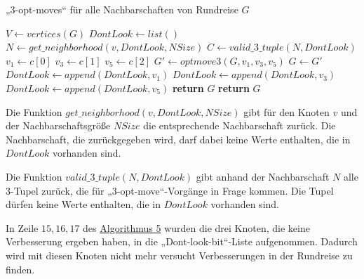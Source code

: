 \begin{algorithm}
  \caption{„3-opt-moves“ für alle Nachbarschaften von Rundreise $G$}\label{alg:ls3opt_run}
\begin{algorithmic}[1]
   
    \State $V \gets vertices(G)$
    \State $DontLook \gets list()$
      \State $N \gets get\_neighborhood(v, DontLook, NSize)$
      \State $C \gets valid\_3\_tuple(N, DontLook)$
        \State $v_1 \gets c[0]$
        \State $v_3 \gets c[1]$
        \State $v_5 \gets c[2]$
        \State $G' \gets optmove3(G, v_1,v_3,v_5)$ 
          \State $G \gets G'$ 
        \Else
          \State $DontLook \gets append(DontLook, v_1)$ 
          \State $DontLook \gets append(DontLook, v_3)$
          \State $DontLook \gets append(DontLook, v_5)$
        \EndIf
      \EndForeach
        \State \textbf{return} $G$ 
      \EndIf
    \EndForeach
    \State \textbf{return} $G$
  \EndProcedure
\end{algorithmic}
\end{algorithm}

\begin{bem}
  Die Funktion $get\_neighborhood(v, DontLook, NSize)$ gibt für den
  Knoten $v$ und der Nachbarschaftsgröße $NSize$ die entsprechende
  Nachbarschaft zurück. Die Nachbarschaft, die zurückgegeben wird, darf
  dabei keine Werte enthalten, die in $DontLook$ vorhanden sind.
\end{bem}

\begin{bem}
Die Funktion $valid\_3\_tuple(N, DontLook)$ gibt anhand der
  Nachbarschaft $N$ alle 3-Tupel zurück, die für „3-opt-move“-Vorgänge
  in Frage kommen. Die Tupel dürfen keine Werte enthalten, die in
  $DontLook$ vorhanden sind.
\end{bem}
In Zeile $15,16,17$ des \hyperref[alg:ls3opt_run]{Algorithmus 5} wurden die drei Knoten, die keine
Verbesserung ergeben haben, in die „Dont-look-bit“-Liste aufgenommen.
Dadurch wird mit diesen Knoten nicht mehr versucht Verbesserungen in der
Rundreise zu finden. 
